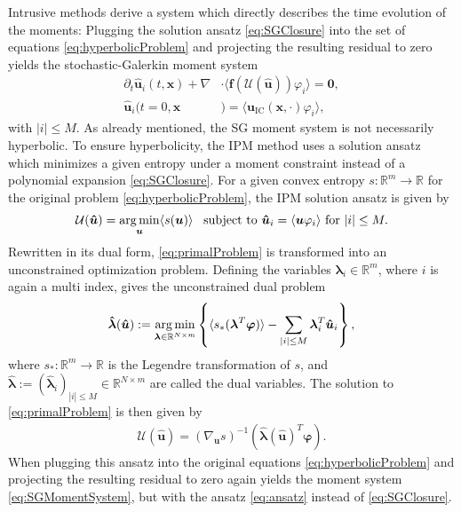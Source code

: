 Intrusive methods derive a system which directly describes the time evolution of the moments: Plugging the solution ansatz \eqref{eq:SGClosure} into the set of equations \eqref{eq:hyperbolicProblem} and projecting the resulting residual to zero yields the stochastic-Galerkin moment system
\begin{subequations}\label{eq:SGMomentSystem}
\begin{align}
\partial_t \bm{\hat u}_i(t,\bm{x}) + \nabla&\cdot\langle\bm{f}(\mathcal{U}(\bm{\hat u})) \varphi_i\rangle = \bm{0}, \\
\bm{\hat u}_i(t=0,\bm{x}&) = \langle\bm{u}_{\text{IC}}(\bm{x},\cdot)\varphi_i\rangle,
\end{align}
\end{subequations}
with $|i|\leq M$. As already mentioned, the SG moment system is not necessarily hyperbolic. To ensure hyperbolicity, the IPM method uses a solution ansatz which minimizes a given entropy under a moment constraint instead of a polynomial expansion \eqref{eq:SGClosure}. For a given convex entropy $s:\mathbb{R}^m\to\mathbb{R}$ for the original problem \eqref{eq:hyperbolicProblem}, the IPM solution ansatz is given by
\begin{align}\label{eq:primalProblem}
\mathcal{U}(\bm{\hat u}) = \operatorname*{arg\,min}_{\bm u} \langle s(\bm u) \rangle \enskip \text{ subject to } \bm{\hat u}_i = \langle \bm u \varphi_i \rangle \text{ for } |i| \leq M.
\end{align}
Rewritten in its dual form, \eqref{eq:primalProblem} is transformed into an unconstrained optimization problem. Defining the variables $\bm{\lambda}_i\in\mathbb{R}^m$, where $i$ is again a multi index, gives the unconstrained dual problem
\begin{align}\label{eq:dualProblem}
 \bm{\hat \lambda}(\bm{\hat u}) := \operatorname*{arg\,min}_{\bm{\lambda} \in \mathbb{R}^{N \times m}}
  \left\{\langle s_*(\bm{\lambda}^T \bm\varphi)\rangle - \sum_{|i|\leq M}\bm{\lambda}_i^T \bm{\hat u}_i\right\},
\end{align}
where $s_*:\mathbb{R}^m\to\mathbb{R}$ is the Legendre transformation of $s$, and $\bm{ \hat\lambda}:=(\bm{\hat{\lambda}}_i)_{|i|\leq M}\in \mathbb{R}^{N \times m}$ are called the dual variables. The solution to \eqref{eq:primalProblem} is then given by
\begin{align}\label{eq:ansatz}
 \mathcal{U}(\bm{\hat u}) = \left( \nabla_{\bm{u}} s \right)^{-1}(\bm{\hat{\lambda}}(\bm{\hat u})^T \bm{\varphi}).
\end{align}
When plugging this ansatz into the original equations \eqref{eq:hyperbolicProblem} and projecting the resulting residual to zero again yields the moment system \eqref{eq:SGMomentSystem}, but with the ansatz \eqref{eq:ansatz} instead of \eqref{eq:SGClosure}.